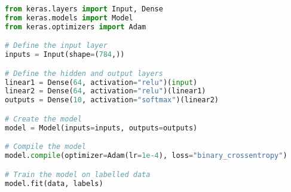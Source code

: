 \begin{lstlisting}[float={ht},caption={A small code snippet defining a simple fully connected ANN with an input of a 1D tensor of length 784, two hidden layers both containing 64 units with ReLU actiation functions, and an output layer containing 10 units using the softmax activation function. The network is then trained using the Keras implementation of the Adam optimiser to minimise the binary cross-entropy loss.},label={lst:keras},language=Python,upquote=true]
from keras.layers import Input, Dense
from keras.models import Model
from keras.optimizers import Adam

# Define the input layer
inputs = Input(shape=(784,))

# Define the hidden and output layers
linear1 = Dense(64, activation="relu")(input)
linear2 = Dense(64, activation="relu")(linear1)
outputs = Dense(10, activation="softmax")(linear2)

# Create the model
model = Model(inputs=inputs, outputs=outputs)

# Compile the model
model.compile(optimizer=Adam(lr=1e-4), loss="binary_crossentropy")

# Train the model on labelled data
model.fit(data, labels)
\end{lstlisting}